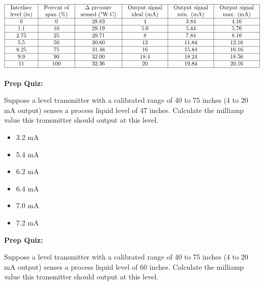 \documentclass[12pt,a4paper]{article}
\begin{document}
$$\vbox{\offinterlineskip
\halign{\strut
\vrule \quad\hfil # \ \hfil & 
\vrule \quad\hfil # \ \hfil & 
\vrule \quad\hfil # \ \hfil & 
\vrule \quad\hfil # \ \hfil & 
\vrule \quad\hfil # \ \hfil & 
\vrule \quad\hfil # \ \hfil \vrule \cr
\noalign{\hrule}
%
Interface & Percent of & $\Delta$ pressure & Output signal & Output signal & Output signal \cr
%
level (in) & span (\%) & sensed ("W.C) & ideal (mA) & min. (mA) & max. (mA) \cr
%
\noalign{\hrule}
%
0 & 0 & 28.83 & 4 & 3.84 & 4.16 \cr
%
\noalign{\hrule}
%
1.1 & 10 & 29.19 & 5.6 & 5.44 & 5.76 \cr
%
\noalign{\hrule}
%
2.75 & 25 & 29.71 & 8 & 7.84 & 8.16 \cr
%
\noalign{\hrule}
%
5.5 & 50 & 30.60 & 12 & 11.84 & 12.16 \cr
%
\noalign{\hrule}
%
8.25 & 75 & 31.48 & 16 & 15.84 & 16.16 \cr
%
\noalign{\hrule}
%
9.9 & 90 & 32.00 & 18.4 & 18.24 & 18.56 \cr
%
\noalign{\hrule}
%
11 & 100 & 32.36 & 20 & 19.84 & 20.16 \cr
%
\noalign{\hrule}
} %
}$$ %












\vfil \eject

\noindent
{\bf Prep Quiz:}

Suppose a level transmitter with a calibrated range of 40 to 75 inches (4 to 20 mA output) senses a process liquid level of 47 inches.  Calculate the milliamp value this transmitter should output at this level.

\begin{itemize}
\item{} 3.2 mA
\vskip 5pt 
\item{} 5.4 mA
\vskip 5pt 
\item{} 6.2 mA
\vskip 5pt 
\item{} 6.4 mA
\vskip 5pt 
\item{} 7.0 mA
\vskip 5pt 
\item{} 7.2 mA
\end{itemize}






\vfil \eject

\noindent
{\bf Prep Quiz:}

Suppose a level transmitter with a calibrated range of 40 to 75 inches (4 to 20 mA output) senses a process liquid level of 60 inches.  Calculate the milliamp value this transmitter should output at this level.
\end{document}

